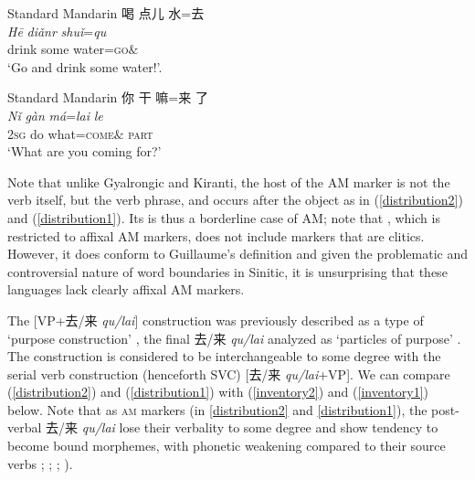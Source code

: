\documentclass[oneside,a4paper,11pt]{article}
\newcommand{\ipa}[1]{{\phon\textit{#1}}}
\newcommand{\zh}[1]{{\cn #1}}
\newcommand{\sens}[1]{‘#1’}
\begin{document}
\begin{exe}
\ex Standard Mandarin \citep{lamarre17deictic} \label{distribution2}
\glll
\zh{喝} \zh{点儿} \zh{水}=\zh{去} \\
\ipa{Hē} \ipa{diǎnr} \ipa{shuǐ}=\ipa{qu} \\
drink  some water=\textsc{go}$\&$ \\
\glt \sens{Go and drink some water!}.
\end{exe}

\begin{exe}
\ex Standard Mandarin \citep{lamarre17motion.cum} \label{distribution1}
\glll
\zh{你} \zh{干} \zh{嘛}=\zh{来} \zh{了} \\
\ipa{Nǐ} \ipa{gàn} \ipa{má}=\ipa{lai} \ipa{le} \\
\textsc{2sg} do what=\textsc{come}$\&$ \textsc{part} \\
\glt \sens{What are you coming for?}
\end{exe}

Note that unlike Gyalrongic and Kiranti, the host of the AM marker is not the verb itself, but the verb phrase, and occurs after the object as in (\ref{distribution2}) and (\ref{distribution1}). Its is thus a borderline case of AM; note that \citet{guillaume16am}, which is restricted to affixal AM markers, does not include markers that are  clitics. However, it does conform to Guillaume's definition and given the problematic and controversial nature of word boundaries in Sinitic, it is unsurprising that these languages lack clearly affixal AM markers.

The [VP+\zh{去/来} \ipa{qu/lai}] construction was previously described as a type of \sens{purpose construction} \citetext{\citealp{lu1985vpqu}; \citealp{yang2012mudi}}, the final \zh{去/来} \ipa{qu/lai} analyzed as `particles of purpose' \citep[479]{chao68chinese}. The construction is considered to be interchangeable to some degree with the serial verb construction (henceforth SVC) [\zh{去/来} \ipa{qu/lai}+VP]. We can compare (\ref{distribution2}) and (\ref{distribution1}) with (\ref{inventory2}) and (\ref{inventory1}) below. Note that as \textsc{am} markers (in \ref{distribution2} and \ref{distribution1}), the post-verbal \zh{去/来} \ipa{qu/lai} lose their verbality to some degree and show tendency to become bound morphemes, with phonetic weakening compared to their source verbs  \citealp[479]{chao68chinese}; \citealp{lu1985vpqu}; \cite{lamarre17motion.cum} ; \cite{lamarre17deictic}).

\end{document}
